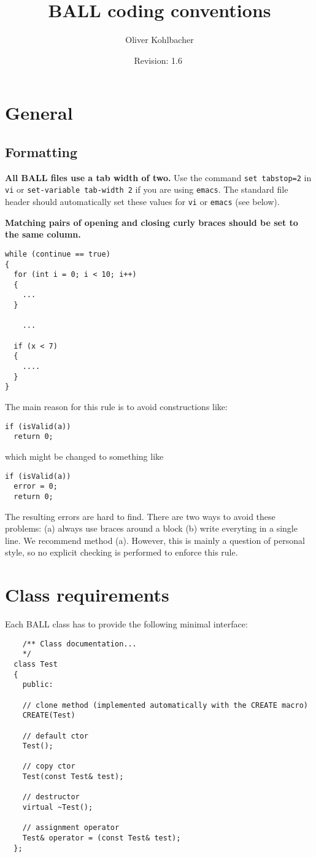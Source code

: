 \documentclass[a4paper,10pt]{article}
\title{BALL coding conventions}
\author{Oliver Kohlbacher}
\date{$ $Revision: 1.6 $ $}
\begin{document}
\maketitle

\section{General}

\subsection{Formatting}

{\bf All BALL files use a tab width of two.} Use the command {\tt set tabstop=2} in
{\tt vi} or {\tt set-variable tab-width 2} if you are using {\tt emacs}. The
standard file header should automatically set these values for {\tt vi} or
{\tt emacs} (see below).

\noindent
{\bf Matching pairs of opening and closing curly braces should be set to the same
column.}

\begin{verbatim}
while (continue == true)
{
  for (int i = 0; i < 10; i++)
  {
    ...
  }

 	...

  if (x < 7)
  {
    ....
  }
}
\end{verbatim}
The main reason for this rule is to avoid constructions like:

\begin{verbatim}
if (isValid(a))
  return 0;
\end{verbatim}

which might be changed to something like

\begin{verbatim}
if (isValid(a))
  error = 0;
  return 0;
\end{verbatim}

The resulting errors are hard to find. There are two ways to avoid these
problems: (a) always use braces around a block (b) write everyting in a single
line. We recommend method (a).
However, this is mainly a question of personal style, so no explicit checking
is performed to enforce this rule.



\section{Class requirements}

Each BALL class has to provide the following minimal interface:
\begin{verbatim}
	/** Class documentation... 
	*/
  class Test
  {
    public:

    // clone method (implemented automatically with the CREATE macro)
    CREATE(Test)    

    // default ctor
    Test();

    // copy ctor 
    Test(const Test& test);

    // destructor 
    virtual ~Test();
 
    // assignment operator
    Test& operator = (const Test& test);
  };
\end{verbatim}
\end{document}
